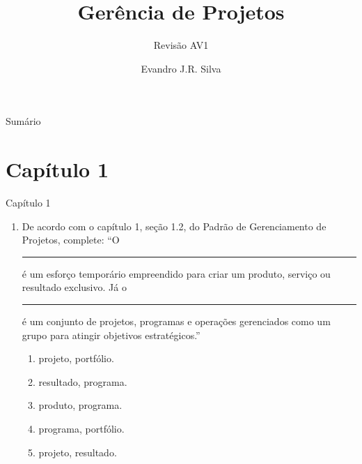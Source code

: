 \documentclass{beamer}
\title[GP 05]{Gerência de Projetos}
\subtitle{Revisão AV1}
\author[E.J.R. Silva]{Evandro J.R. Silva}
\date{}
\begin{document}
    
\begin{frame}
    \titlepage
\end{frame}

\begin{frame}{Sumário}
    \tableofcontents
\end{frame}

\section{Capítulo 1}

\begin{frame}{Capítulo 1}
    \begin{enumerate}
        \justifying
        \item De acordo com o capítulo 1, seção 1.2, do Padrão de Gerenciamento de Projetos, complete: ``O \rule{50pt}{1pt} é um esforço temporário empreendido para criar um produto, serviço ou resultado exclusivo. Já o \rule{50pt}{1pt} é um conjunto de projetos, programas e operações gerenciados como um grupo para atingir objetivos estratégicos.''
        	\begin{enumerate}[a]
        		\item \alert<2>{projeto, portfólio}.
        		\item resultado, programa.
        		\item produto, programa.
        		\item programa, portfólio.
        		\item projeto, resultado.
        	\end{enumerate}
    \end{enumerate}
\end{frame}
\end{document}
